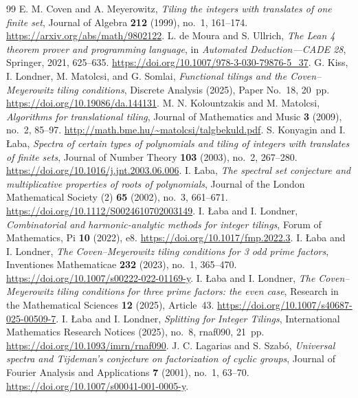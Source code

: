 \documentclass[11pt]{article}
\begin{document}
\begin{thebibliography}{99}
 E. M. Coven and A. Meyerowitz, \emph{Tiling the integers with translates of one finite set}, Journal of Algebra \textbf{212} (1999), no.~1, 161--174. \url{https://arxiv.org/abs/math/9802122}.
 L. de Moura and S. Ullrich, \emph{The Lean 4 theorem prover and programming language}, in \emph{Automated Deduction---CADE 28}, Springer, 2021, 625--635. \url{https://doi.org/10.1007/978-3-030-79876-5_37}.
 G. Kiss, I. Londner, M. Matolcsi, and G. Somlai, \emph{Functional tilings and the Coven--Meyerowitz tiling conditions}, Discrete Analysis (2025), Paper No.~18, 20~pp. \url{https://doi.org/10.19086/da.144131}.
 M. N. Kolountzakis and M. Matolcsi, \emph{Algorithms for translational tiling}, Journal of Mathematics and Music \textbf{3} (2009), no.~2, 85--97. \url{http://math.bme.hu/~matolcsi/talgbekuld.pdf}.
 S. Konyagin and I. \L aba, \emph{Spectra of certain types of polynomials and tiling of integers with translates of finite sets}, Journal of Number Theory \textbf{103} (2003), no.~2, 267--280. \url{https://doi.org/10.1016/j.jnt.2003.06.006}.
 I. \L aba, \emph{The spectral set conjecture and multiplicative properties of roots of polynomials}, Journal of the London Mathematical Society (2) \textbf{65} (2002), no.~3, 661--671. \url{https://doi.org/10.1112/S0024610702003149}.
 I. \L aba and I. Londner, \emph{Combinatorial and harmonic-analytic methods for integer tilings}, Forum of Mathematics, Pi \textbf{10} (2022), e8. \url{https://doi.org/10.1017/fmp.2022.3}.
 I. \L aba and I. Londner, \emph{The Coven--Meyerowitz tiling conditions for 3 odd prime factors}, Inventiones Mathematicae \textbf{232} (2023), no.~1, 365--470. \url{https://doi.org/10.1007/s00222-022-01169-y}.
 I. \L aba and I. Londner, \emph{The Coven--Meyerowitz tiling conditions for three prime factors: the even case}, Research in the Mathematical Sciences \textbf{12} (2025), Article~43. \url{https://doi.org/10.1007/s40687-025-00509-7}.
 I. \L aba and I. Londner, \emph{Splitting for Integer Tilings}, International Mathematics Research Notices (2025), no.~8, rnaf090, 21~pp. \url{https://doi.org/10.1093/imrn/rnaf090}.
 J. C. Lagarias and S. Szab\'o, \emph{Universal spectra and Tijdeman's conjecture on factorization of cyclic groups}, Journal of Fourier Analysis and Applications \textbf{7} (2001), no.~1, 63--70. \url{https://doi.org/10.1007/s00041-001-0005-y}.

\end{thebibliography}
\end{document}
